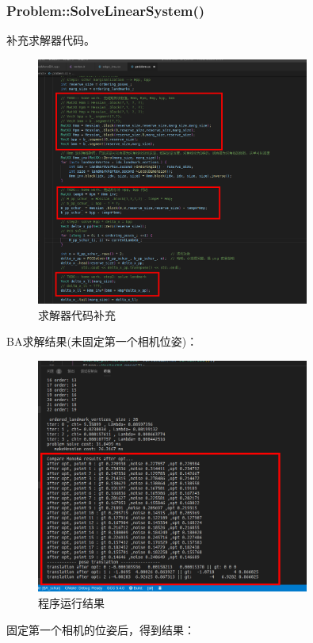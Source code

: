 \documentclass[UTF8]{ctexart}
\begin{document}
\subsubsection{Problem::SolveLinearSystem()}
\indent 补充求解器代码。\\
\begin{figure}[H]
\centering
\includegraphics[width=0.8\textwidth]{1.1.2.jpg}    
\caption{求解器代码补充}
\label{img0}
\end{figure}
\indent BA求解结果(未固定第一个相机位姿)：\\
\begin{figure}[H]
\centering
\includegraphics[width=0.8\textwidth]{1_1_2.jpg}    
\caption{程序运行结果}
\label{img0}
\end{figure}
\indent 固定第一个相机的位姿后，得到结果：\\
\end{document}
